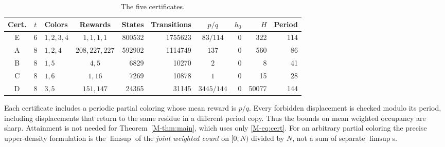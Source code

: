 \documentclass[11pt,reqno]{amsart}
\theoremstyle{plain}
\theoremstyle{plain}
\theoremstyle{plain}
\begin{document}
\begin{table}[h]
\centering
\footnotesize
\setlength{\tabcolsep}{4pt}
\begin{tabular}{cclcrrcrrr}
\toprule
Cert. & $t$ & Colors & Rewards & States & Transitions & $p/q$ & $h_0$ & $H$ & Period \\
\midrule
E & 6 & $1,2,3,4$ & $1,1,1,1$ & 800532 & 1755623 & $83/114$ & 0 & 322 & 114 \\
A & 8 & $1,2,4$   & $208,227,227$ & 592902 & 1114749 & $137$ & 0 & 560 & 86 \\
B & 8 & $1,5$     & $4,5$ & 6829 & 10270 & $2$ & 0 & 8 & 41 \\
C & 8 & $1,6$     & $1,16$ & 7269 & 10878 & $1$ & 0 & 15 & 28 \\
D & 8 & $3,5$     & $151,147$ & 24365 & 31145 & $3445/144$ & 0 & 50077 & 144 \\
\bottomrule
\end{tabular}
\caption{The five certificates.}\label{M-tab:scalar-certificates}
\end{table}

Each certificate includes a periodic partial coloring whose mean reward is
$p/q$. Every forbidden displacement is checked modulo its period, including
displacements that return to the same residue in a different period copy. Thus
the bounds on mean weighted occupancy are sharp. Attainment is not needed for
Theorem~\ref{M-thm:main}, which uses only \eqref{M-eq:cert}. For an arbitrary
partial coloring the precise upper-density formulation is the $\limsup$ of the
\emph{joint weighted count} on $[0,N)$ divided by $N$, not a sum of separate
$\limsup$s.
\end{document}
